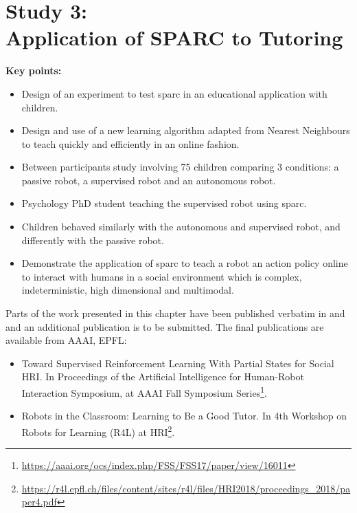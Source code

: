\chapter[Study 3: Application of SPARC to Tutoring]{Study 3: \\Application of SPARC to Tutoring}\label{chap:tutoring}
\glsresetall
\graphicspath{{images/tutoring/}}

\begin{framed}
	\textbf{Key points:}
	
	\begin{itemize}
		\item Design of an experiment to test \acrshort{sparc} in an educational application with children.
		\item Design and use of a new learning algorithm adapted from Nearest Neighbours to teach quickly and efficiently in an online fashion.
		\item Between participants study involving 75 children comparing 3 conditions: a passive robot, a supervised robot and an autonomous robot.
		\item Psychology PhD student teaching the supervised robot using \acrshort{sparc}.
		\item Children behaved similarly with the autonomous and supervised robot, and differently with the passive robot.
		\item Demonstrate  the application of \acrshort{sparc} to teach a robot an action policy online to interact with humans in a social environment which is complex, indeterministic, high dimensional and multimodal.
	\end{itemize}
\end{framed}

Parts of the work presented in this chapter have been published verbatim in \cite{senft2017toward} and \cite{senft2018robots} and an additional publication is to be submitted. The final publications are available from AAAI, EPFL:
\begin{itemize}
	\item Toward Supervised
	Reinforcement Learning With Partial States for Social HRI. In Proceedings of the Artificial Intelligence for Human-Robot Interaction Symposium, at AAAI Fall Symposium Series\footnote{\url{https://aaai.org/ocs/index.php/FSS/FSS17/paper/view/16011}}.
	\item Robots in the Classroom: Learning to Be a Good Tutor. In 4th Workshop on Robots for Learning (R4L) at HRI\footnote{\url{https://r4l.epfl.ch/files/content/sites/r4l/files/HRI2018/proceedings_2018/paper4.pdf}}.
\end{itemize} 

